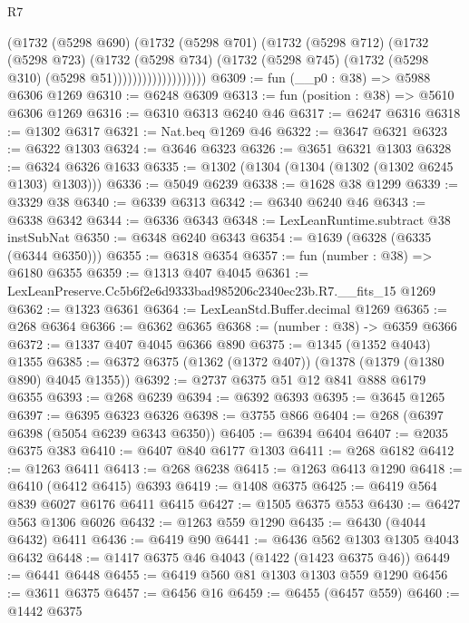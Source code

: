 \begin{lexlean}{R7}
\begin{coremodule}
                          (@1732
                            (@5298 @690)
                            (@1732
                              (@5298 @701)
                              (@1732
                                (@5298 @712)
                                (@1732
                                  (@5298 @723)
                                  (@1732
                                    (@5298 @734)
                                    (@1732
                                      (@5298 @745)
                                      (@1732 (@5298 @310) (@5298 @51)))))))))))))))))))
@6309 := fun (__p0 : @38) => @5988 @6306 @1269
@6310 := @6248 @6309
@6313 := fun (position : @38) => @5610 @6306 @1269
@6316 := @6310 @6313 @6240 @46
@6317 := @6247 @6316
@6318 := @1302 @6317
@6321 := Nat.beq @1269 @46
@6322 := @3647 @6321
@6323 := @6322 @1303
@6324 := @3646 @6323
@6326 := @3651 @6321 @1303
@6328 := @6324 @6326 @1633
@6335 := @1302 (@1304 (@1304 (@1302 (@1302 @6245 @1303) @1303)))
@6336 := @5049 @6239
@6338 := @1628 @38 @1299
@6339 := @3329 @38
@6340 := @6339 @6313
@6342 := @6340 @6240 @46
@6343 := @6338 @6342
@6344 := @6336 @6343
@6348 := LexLeanRuntime.subtract @38 instSubNat
@6350 := @6348 @6240 @6343
@6354 := @1639 (@6328 (@6335 (@6344 @6350)))
@6355 := @6318 @6354
@6357 := fun (number : @38) => @6180 @6355
@6359 := @1313 @407 @4045
@6361 := LexLeanPreserve.Cc5b6f2e6d9333bad985206c2340ec23b.R7.__fits_15 @1269
@6362 := @1323 @6361
@6364 := LexLeanStd.Buffer.decimal @1269
@6365 := @268 @6364
@6366 := @6362 @6365
@6368 := (number : @38) -> @6359 @6366
@6372 := @1337 @407 @4045 @6366 @890
@6375 := @1345 (@1352 @4043) @1355
@6385 := @6372 @6375 (@1362 (@1372 @407)) (@1378 (@1379 (@1380 @890) @4045 @1355))
@6392 := @2737 @6375 @51 @12 @841 @888 @6179 @6355
@6393 := @268 @6239
@6394 := @6392 @6393
@6395 := @3645 @1265
@6397 := @6395 @6323 @6326
@6398 := @3755 @866
@6404 := @268 (@6397 @6398 (@5054 @6239 @6343 @6350))
@6405 := @6394 @6404
@6407 := @2035 @6375 @383
@6410 := @6407 @840 @6177 @1303
@6411 := @268 @6182
@6412 := @1263 @6411
@6413 := @268 @6238
@6415 := @1263 @6413 @1290
@6418 := @6410 (@6412 @6415) @6393
@6419 := @1408 @6375
@6425 := @6419 @564 @839 @6027 @6176 @6411 @6415
@6427 := @1505 @6375 @553
@6430 := @6427 @563 @1306 @6026
@6432 := @1263 @559 @1290
@6435 := @6430 (@4044 @6432) @6411
@6436 := @6419 @90
@6441 := @6436 @562 @1303 @1305 @4043 @6432
@6448 := @1417 @6375 @46 @4043 (@1422 (@1423 @6375 @46))
@6449 := @6441 @6448
@6455 := @6419 @560 @81 @1303 @1303 @559 @1290
@6456 := @3611 @6375
@6457 := @6456 @16
@6459 := @6455 (@6457 @559)
@6460 := @1442 @6375

\end{coremodule}
\end{lexlean}
